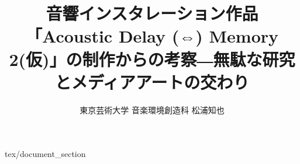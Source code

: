\documentclass[report,twocolumn]{jsbook}
\title {音響インスタレーション作品「Acoustic Delay (⇔) Memory 2(仮)」の制作からの考察―無駄な研究とメディアアートの交わり}
\author {東京芸術大学 音楽環境創造科 松浦知也}
\begin{document}
\maketitle

\tableofcontents

 {tex/document_section}
\end{document}
